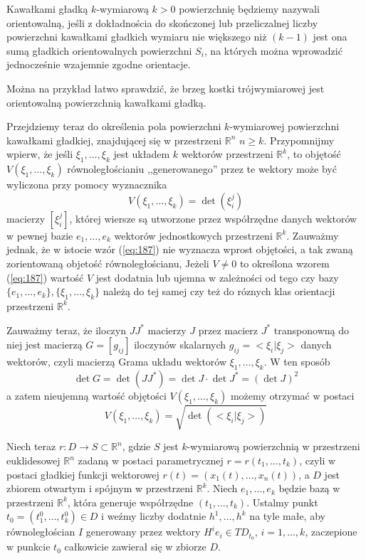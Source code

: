 \documentclass[leqno]{article}
\begin{document}
\begin{justify}
\begin{defn}
    Kawałkami gładką $k$-wymiarową $k > 0$ powierzchnię będziemy nazywali orientowalną, jeśli z dokładnościa do skończonej lub przeliczalnej liczby powierzchni 
    kawałkami gładkich wymiaru nie większego niż $(k-1)$ jest ona sumą gładkich orientowalnych powierzchni $S_i$, na których można wprowadzić jednocześnie wzajemnie zgodne orientacje.
\end{defn}

Można na przykład łatwo sprawdzić, że brzeg kostki trójwymiarowej jest orientowalną powierzchnią kawałkami gładką.

Przejdziemy teraz do określenia pola powierzchni $k$-wymiarowej powierzchni kawałkami gładkiej, znajdującej się w przestrzeni $\mathbb{R}^n$ $n \geqslant k$.
Przypomnijmy wpierw, że jeśli $\xi_1, \ldots, \xi_k$ jest układem $k$ wektorów przestrzeni $\mathbb{R}^k$, to objętość 
$V(\xi_1, \ldots, \xi_k)$ równoległościaniu ,,generowanego'' przez te wektory może być wyliczona przy pomocy wyznacznika 
\begin{equation}\label{eq:187}
    V(\xi_1, \ldots, \xi_k) = \det({\xi_i^j})
\end{equation}
macierzy $[\xi_i^j]$, której wiersze są utworzone przez współrzędne danych wektorów w pewnej bazie $e_1, \ldots, e_k$ wektorów jednostkowych przestrzeni $\mathbb{R}^k$.
Zauważmy jednak, że w istocie wzór (\ref{eq:187}) nie wyznacza wprost objętości, a tak zwaną zorientowaną objetość równoległościanu,
Jeżeli $V \neq 0$ to określona wzorem (\ref{eq:187}) wartość $V$ jest dodatnia lub ujemna w zależności od tego czy bazy $\{e_1, \ldots, e_k\}, \{\xi_1, \ldots, \xi_k\}$
należą do tej samej czy też do róznych klas orientacji przestrzeni $\mathbb{R}^k$.

Zauważmy teraz, że iloczyn $JJ^*$ macierzy $J$ przez macierz $J^*$ transponowną do niej jest macierzą $G = [g_{ij}]$ iloczynów 
skalarnych $g_{ij} = <\xi_i | \xi_j >$ danych wektorów, czyli macierzą Grama układu wektorów $\xi_1, \ldots, \xi_k$. W ten sposób 
\begin{equation}\label{eq:188}
    \det G = \det (J J^*) = \det J \cdot \det J^* = (\det J)^2
\end{equation}
a zatem nieujemną wartość objętości $V(\xi_1, \ldots, \xi_k)$ możemy otrzymać w postaci 
\begin{equation}\label{eq:189}
    V(\xi_1, \ldots, \xi_k) = \sqrt{\det ( <\xi_i | \xi_j > )}
\end{equation}

Niech teraz $r : D \to S \subset \mathbb{R}^n$, gdzie $S$ jest $k$-wymiarową powierzchnią w przestrzeni euklidesowej $\mathbb{R}^n$ zadaną w postaci parametrycznej 
$r = r(t_1, \ldots, t_k)$, czyli w postaci gładkiej funkcji wektorowej $r(t) = (x_1(t), \ldots, x_n(t))$, a $D$ jest zbiorem otwartym i spójnym w przestrzeni $\mathbb{R}^k$.
Niech $e_1, \ldots, e_k$ będzie bazą w przestrzeni $\mathbb{R}^k$, która generuje współrzędne $(t_1, \ldots, t_k)$. Ustalmy punkt $t_0 = (t_1^0, \ldots, t_k^0) \in D$
i weźmy liczby dodatnie $h^1, \ldots, h^k$ na tyle małe, aby równoległościan $I$ generowany przez wektory $H^i e_i \in TD_{t_0}$, $i = 1, \ldots, k$,
zaczepione w punkcie $t_0$ całkowicie zawierał się w zbiorze $D$.


\end{justify}
\end{document}
